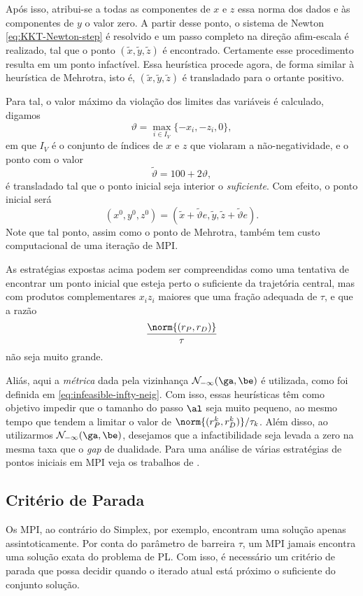 Após isso, atribui-se a todas as componentes de $x$ e $z$ essa norma dos dados e às componentes de $y$ o valor  zero. A
partir desse ponto, o sistema de Newton \eqref{eq:KKT-Newton-step} é resolvido e
 um passo completo na direção afim-escala é realizado, tal que  o ponto
$(\tilde{x},\tilde{y},\tilde{z})$ é encontrado. Certamente esse procedimento resulta em um
ponto infactível. Essa heurística procede agora,  de forma similar à heurística de Mehrotra,
isto é,  $(\tilde{x},\tilde{y},\tilde{z})$ é transladado para o ortante positivo. 

Para tal, o valor
máximo da violação dos limites das variáveis é calculado, digamos 
\[ \vartheta =
\max_{i\in I_V}\{-x_i,-z_i,0\}, \] em que $I_V$ é o conjunto de índices de $x$ e $z$
que violaram a não-negatividade, e  o ponto com o valor \[
\tilde{\vartheta}  = 100 + 2\vartheta, \] é transladado tal que o ponto inicial seja interior
o \emph{suficiente}. Com efeito, o ponto inicial será \[ (x^0,y^0,z^0) = (\tilde{x}+
\tilde{\vartheta} e,\tilde{y},\tilde{z}+\tilde{\vartheta} e).
\]
Note que tal ponto, assim como o ponto de Mehrotra, também tem custo
computacional de uma iteração de \ac{MPI}.

 As estratégias expostas acima podem ser compreendidas
como uma tentativa de encontrar um ponto inicial que esteja perto o suficiente
da trajetória central, mas com  produtos complementares $x_iz_i$ 
maiores que uma fração adequada de $\tau$, e que a razão \[
\frac{\norm{(r_P,r_D)}}{\tau}
\] não seja muito grande. 

Aliás, aqui a \emph{métrica} dada pela vizinhança
$\Nset_{-\infty}(\ga,\be)$ é utilizada, como  foi definida em \eqref{eq:infeasible-infty-neig}. Com isso, essas
heurísticas têm como objetivo impedir que o tamanho do passo $\al$ seja muito
pequeno, ao mesmo tempo que tendem a limitar  o valor de $\norm{(r_P^k
,r_D^k)}/{\tau_k}$. Além disso, ao utilizarmos $\Nset_{-\infty}(\ga,\be)$, desejamos que a
infactibilidade seja levada a zero na mesma taxa que o \emph{gap} de dualidade.
Para uma  análise de várias estratégias de pontos iniciais em
\ac{MPI} veja os trabalhos de \textcite{Gertz:2004cw,DApuzzo:2009ks,Andersen:1996un,Vanderbei:1999wv}.




  
\subsection{Critério de Parada}
\label{subsection:termination-criteria}
Os \ac{MPI}, ao contrário do  Simplex, por exemplo, encontram uma solução apenas
assintoticamente. Por conta do parâmetro de barreira $\tau$, um \ac{MPI} jamais encontra
uma solução exata do problema de \ac{PL}. Com isso, é necessário um critério de
parada que possa decidir quando o iterado atual está próximo o suficiente 
do conjunto solução. 


